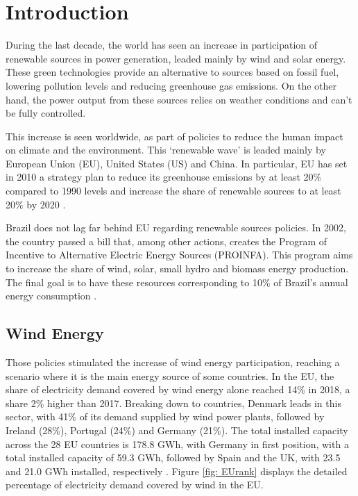 
\chapter[Introduction]{Introduction}

During the last decade, the world has seen an increase in participation of renewable sources in power generation, leaded mainly by wind and solar energy. These green technologies provide an alternative to sources based on fossil fuel, lowering pollution levels and reducing greenhouse gas emissions. On the other hand, the power output from these sources relies on weather conditions and can't be fully controlled.

This increase is seen worldwide, as part of policies to reduce the human impact on climate and the environment. This `renewable wave' is leaded mainly by European Union (EU), United States (US) and China. In particular, EU has set in 2010 a strategy plan to reduce its greenhouse emissions by at least 20\% compared to 1990 levels and increase the share of renewable sources to at least 20\% by 2020 \cite{Europe2020}.

Brazil does not lag far behind EU regarding renewable sources policies. In 2002, the country passed a bill that, among other actions, creates the Program of Incentive to Alternative Electric Energy Sources (PROINFA). This program aims to increase the share of wind, solar, small hydro and biomass energy production. The final goal is to have these resources corresponding to 10\% of Brazil's annual energy consumption \cite{PROINFA2002}.

\section{Wind Energy}

Those policies stimulated the increase of wind energy participation, reaching a scenario where it is the main energy source of some countries. In the EU, the share of electricity demand covered by wind energy alone reached 14\% in 2018, a share 2\% higher than 2017. Breaking down to countries, Denmark leads in this sector, with 41\% of its demand supplied by wind power plants, followed by Ireland (28\%), Portugal (24\%) and Germany (21\%). The total installed capacity across the 28 EU countries is 178.8 GWh, with Germany in first position, with a total installed capacity of 59.3 GWh, followed by Spain and the UK, with 23.5 and 21.0 GWh installed, respectively \cite{WindEurope2019}. Figure \ref{fig: EUrank} displays the detailed percentage of electricity demand covered by wind in the EU.

